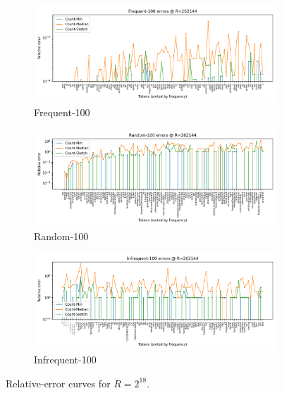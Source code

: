 \documentclass[11pt]{article}
\begin{document}
\begin{figure}[H]
  \centering
  \begin{subfigure}[t]{0.32\linewidth}
    \centering
    \includegraphics[width=\linewidth]{../outputs/a2/errors_R262144_Frequent_100.png}
    \caption{Frequent-100}
  \end{subfigure}
  \hfill
  \begin{subfigure}[t]{0.32\linewidth}
    \centering
    \includegraphics[width=\linewidth]{../outputs/a2/errors_R262144_Random_100.png}
    \caption{Random-100}
  \end{subfigure}
  \hfill
  \begin{subfigure}[t]{0.32\linewidth}
    \centering
    \includegraphics[width=\linewidth]{../outputs/a2/errors_R262144_Infrequent_100.png}
    \caption{Infrequent-100}
  \end{subfigure}
  \caption{Relative-error curves for $R=2^{18}$.}
  \label{fig:error-r262144}
\end{figure}
\end{document}
